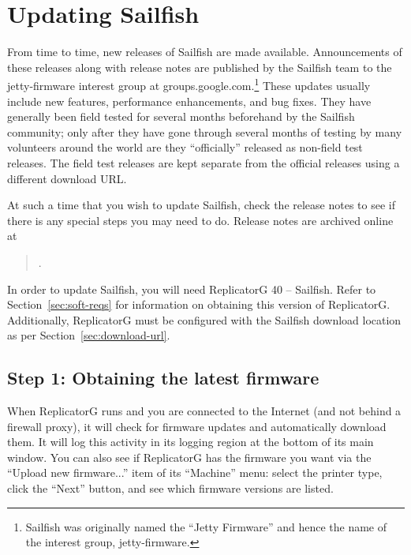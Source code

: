 
\chapter{Updating Sailfish} \label{chap:update}

From time to time, new releases of Sailfish are made available.  Announcements
of these releases along with release notes are published by the Sailfish team
to the jetty-firmware interest group at
groups.google.com.\footnote{Sailfish
was originally named the ``Jetty Firmware'' and hence the name of the
interest group, jetty-firmware.}  These updates usually include new features,
performance enhancements, and bug fixes.  They have generally been field tested
for several months beforehand by the Sailfish community; only after they have
gone through several months of testing by many volunteers around the world
are they ``officially'' released as non-field test releases.  The field test
releases are kept separate from the official releases using a different
download URL.

At such a time that you wish to update Sailfish, check the release notes
to see if there is any special steps you may need to do.  Release notes are
archived online at

\begin{quote}
.
\end{quote}

In order to update Sailfish, you will need ReplicatorG 40 -- Sailfish.  Refer
to Section~\ref{sec:soft-reqs} for information
on obtaining this version of ReplicatorG.  Additionally, ReplicatorG must be
configured with the Sailfish download location as per
Section~\ref{sec:download-url}.


\section{Step 1: Obtaining the latest firmware}

When ReplicatorG runs and you are connected to the Internet (and not
behind a firewall proxy), it will check for firmware updates and
automatically download them.  It will log this activity in its logging
region at the bottom of its main window.  You can also see if
ReplicatorG has the firmware you want via the ``Upload new
firmware...'' item of its ``Machine'' menu: select the printer type,
click the ``Next'' button, and see which firmware versions are listed.

